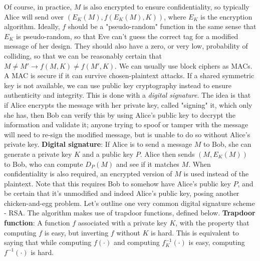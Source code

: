 \documentclass{article}
\begin{document}
\newline
\indent Of course, in practice, $ M $ is also encrypted to ensure confidentiality, so typically Alice will send over $ (E_K(M), f(E_K(M), K)) $, where $ E_K $ is the encryption algorithm. Ideally, $ f $ should be a "pseudo-random" function in the same sense that $ E_K $ is pseudo-random, so that Eve can't guess the correct tag for a modified message of her design. They should also have a zero, or very low, probability of colliding, so that we can be reasonably certain that $ M \neq M' \rightarrow f(M, K) \neq f(M', K) $. We can usually use block ciphers as MACs. A MAC is secure if it can survive chosen-plaintext attacks.
\newline \newline
If a shared symmetric key is not available, we can use public key cryptography instead to ensure authenticity and integrity. This is done with a \textit{digital signature}. The idea is that if Alice encrypts the message with her private key, called "signing" it, which only she has, then Bob can verify this by using Alice's public key to decrypt the information and validate it; anyone trying to spoof or tamper with the message will need to re-sign the modified message, but is unable to do so without Alice's private key.
\newline \newline
\textbf{Digital signature}: If Alice is to send a message $ M $ to Bob, she can generate a private key $ K $ and a public key $ P $. Alice then sends $ (M, E_K(M)) $ to Bob, who can compute $ D_P(M) $ and see if it matches $ M $. When confidentiality is also required, an encrypted version of $ M $ is used instead of the plaintext.
\newline
\indent Note that this requires Bob to somehow have Alice's public key $ P $, and be certain that it's unmodified and indeed Alice's public key, posing another chicken-and-egg problem.
\newline \newline
Let's outline one very common digital signature scheme - RSA. The algorithm makes use of trapdoor functions, defined below.
\newline \newline
\textbf{Trapdoor function}: A function $ f $ associated with a private key $ K $, with the property that computing $ f $ is easy, but inverting $ f $ without $ K $ is hard. This is equivalent to saying that while computing $ f(\cdot) $ and computing $ f^{-1}_K (\cdot) $ is easy, computing $ f^{-1} (\cdot) $ is hard.
\end{document}
